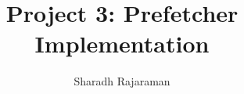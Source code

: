 \documentclass[multicol,date,tikzlibs,minted,ieeebib,bibtex]{epreport}
\title{Project 3: Prefetcher Implementation}
\author{Sharadh Rajaraman}
\begin{document}
\maketitle

\begin{multicols}{2}
	\section{}
\end{multicols}



\printbibliography{}
\end{document}
